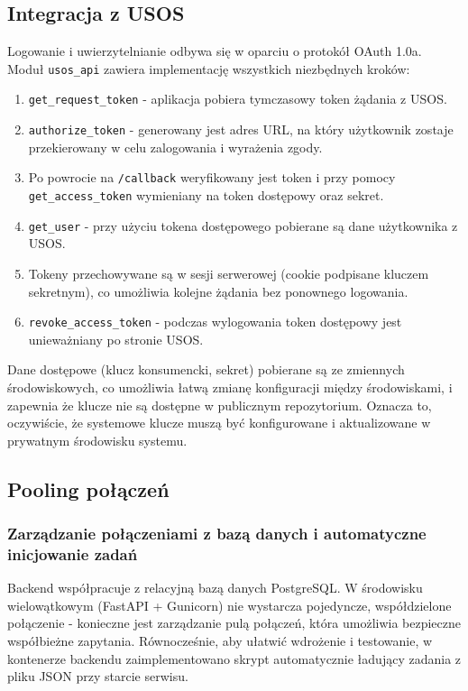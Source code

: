 \documentclass[12pt,a4paper]{article}
\begin{document}
\subsection{Integracja z USOS}

Logowanie i uwierzytelnianie odbywa się w oparciu o protokół OAuth 1.0a. Moduł \texttt{usos\_api} zawiera implementację wszystkich niezbędnych kroków:
\begin{enumerate}
    \item \texttt{get\_request\_token} - aplikacja pobiera tymczasowy token żądania z USOS.
    \item \texttt{authorize\_token} - generowany jest adres URL, na który użytkownik zostaje przekierowany w celu zalogowania i wyrażenia zgody.
    \item Po powrocie na \texttt{/callback} weryfikowany jest token i przy pomocy \texttt{get\_access\_token} wymieniany na token dostępowy oraz sekret.
    \item \texttt{get\_user} - przy użyciu tokena dostępowego pobierane są dane użytkownika z USOS.
    \item Tokeny przechowywane są w sesji serwerowej (cookie podpisane kluczem sekretnym), co umożliwia kolejne żądania bez ponownego logowania.
    \item \texttt{revoke\_access\_token} - podczas wylogowania token dostępowy jest unieważniany po stronie USOS.
\end{enumerate}
Dane dostępowe (klucz konsumencki, sekret) pobierane są ze zmiennych środowiskowych, co umożliwia łatwą zmianę konfiguracji między środowiskami, i zapewnia że klucze nie są dostępne w publicznym repozytorium. Oznacza to, oczywiście, że systemowe klucze muszą być konfigurowane i aktualizowane w prywatnym środowisku systemu.

\subsection{Pooling połączeń}

\subsubsection{Zarządzanie połączeniami z bazą danych i automatyczne inicjowanie zadań}
Backend współpracuje z relacyjną bazą danych PostgreSQL. W środowisku wielowątkowym (FastAPI + Gunicorn) nie wystarcza pojedyncze, współdzielone połączenie - konieczne jest zarządzanie pulą połączeń, która umożliwia bezpieczne współbieżne zapytania. Równocześnie, aby ułatwić wdrożenie i testowanie, w kontenerze backendu zaimplementowano skrypt automatycznie ładujący zadania z pliku JSON przy starcie serwisu.
\end{document}
